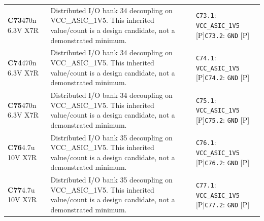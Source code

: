 \documentclass[11pt,a4paper]{article}
\begin{document}
\begin{longtable}{@{}P{27mm}P{83mm}P{58mm}@{}}
\textbf{C73}\newline 470n 6.3V X7R & Distributed I/O bank 34 decoupling on VCC\_ASIC\_1V5. This inherited value/count is a design candidate, not a demonstrated minimum. & \nolinkurl{C73.1}: \nolinkurl{VCC_ASIC_1V5} [P]\newline \nolinkurl{C73.2}: \nolinkurl{GND} [P] \\
\textbf{C74}\newline 470n 6.3V X7R & Distributed I/O bank 34 decoupling on VCC\_ASIC\_1V5. This inherited value/count is a design candidate, not a demonstrated minimum. & \nolinkurl{C74.1}: \nolinkurl{VCC_ASIC_1V5} [P]\newline \nolinkurl{C74.2}: \nolinkurl{GND} [P] \\
\textbf{C75}\newline 470n 6.3V X7R & Distributed I/O bank 34 decoupling on VCC\_ASIC\_1V5. This inherited value/count is a design candidate, not a demonstrated minimum. & \nolinkurl{C75.1}: \nolinkurl{VCC_ASIC_1V5} [P]\newline \nolinkurl{C75.2}: \nolinkurl{GND} [P] \\
\textbf{C76}\newline 4.7u 10V X7R & Distributed I/O bank 35 decoupling on VCC\_ASIC\_1V5. This inherited value/count is a design candidate, not a demonstrated minimum. & \nolinkurl{C76.1}: \nolinkurl{VCC_ASIC_1V5} [P]\newline \nolinkurl{C76.2}: \nolinkurl{GND} [P] \\
\textbf{C77}\newline 4.7u 10V X7R & Distributed I/O bank 35 decoupling on VCC\_ASIC\_1V5. This inherited value/count is a design candidate, not a demonstrated minimum. & \nolinkurl{C77.1}: \nolinkurl{VCC_ASIC_1V5} [P]\newline \nolinkurl{C77.2}: \nolinkurl{GND} [P] \\

\end{longtable}
\end{document}
